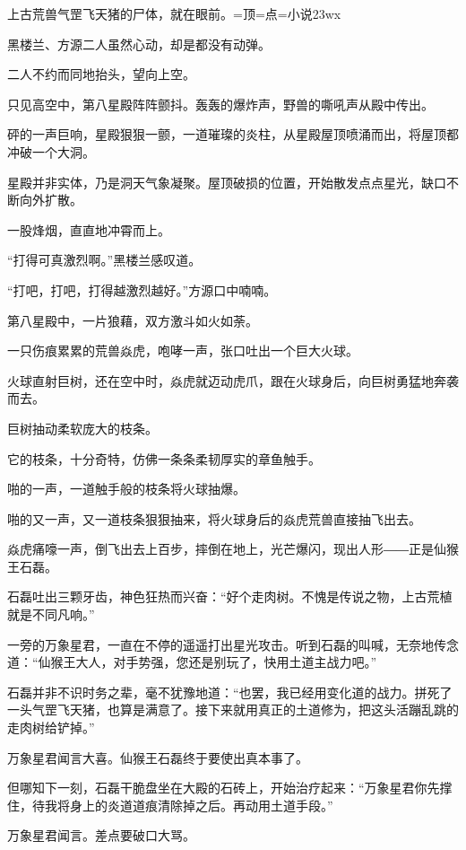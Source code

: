 
\begin{this_body}

上古荒兽气罡飞天猪的尸体，就在眼前。=顶=点=小说23wx

黑楼兰、方源二人虽然心动，却是都没有动弹。

二人不约而同地抬头，望向上空。

只见高空中，第八星殿阵阵颤抖。轰轰的爆炸声，野兽的嘶吼声从殿中传出。

砰的一声巨响，星殿狠狠一颤，一道璀璨的炎柱，从星殿屋顶喷涌而出，将屋顶都冲破一个大洞。

星殿并非实体，乃是洞天气象凝聚。屋顶破损的位置，开始散发点点星光，缺口不断向外扩散。

一股烽烟，直直地冲霄而上。

“打得可真激烈啊。”黑楼兰感叹道。

“打吧，打吧，打得越激烈越好。”方源口中喃喃。

第八星殿中，一片狼藉，双方激斗如火如荼。

一只伤痕累累的荒兽焱虎，咆哮一声，张口吐出一个巨大火球。

火球直射巨树，还在空中时，焱虎就迈动虎爪，跟在火球身后，向巨树勇猛地奔袭而去。

巨树抽动柔软庞大的枝条。

它的枝条，十分奇特，仿佛一条条柔韧厚实的章鱼触手。

啪的一声，一道触手般的枝条将火球抽爆。

啪的又一声，又一道枝条狠狠抽来，将火球身后的焱虎荒兽直接抽飞出去。

焱虎痛嚎一声，倒飞出去上百步，摔倒在地上，光芒爆闪，现出人形――正是仙猴王石磊。

石磊吐出三颗牙齿，神色狂热而兴奋：“好个走肉树。不愧是传说之物，上古荒植就是不同凡响。”

一旁的万象星君，一直在不停的遥遥打出星光攻击。听到石磊的叫喊，无奈地传念道：“仙猴王大人，对手势强，您还是别玩了，快用土道主战力吧。”

石磊并非不识时务之辈，毫不犹豫地道：“也罢，我已经用变化道的战力。拼死了一头气罡飞天猪，也算是满意了。接下来就用真正的土道修为，把这头活蹦乱跳的走肉树给铲掉。”

万象星君闻言大喜。仙猴王石磊终于要使出真本事了。

但哪知下一刻，石磊干脆盘坐在大殿的石砖上，开始治疗起来：“万象星君你先撑住，待我将身上的炎道道痕清除掉之后。再动用土道手段。”

万象星君闻言。差点要破口大骂。


\end{this_body}
